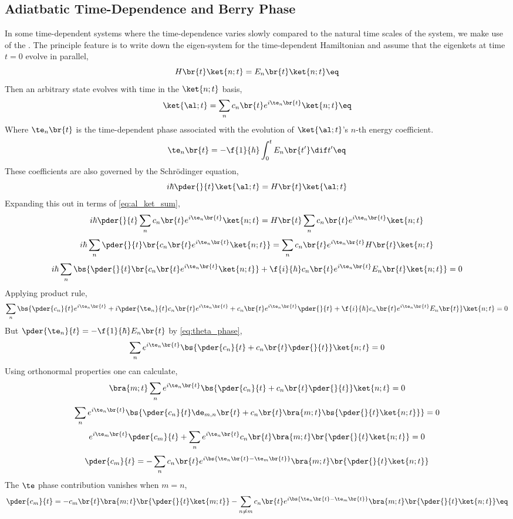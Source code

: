\documentclass{article}
\begin{document}
\subsection{Adiatbatic Time-Dependence and Berry Phase}
In some time-dependent systems where the time-dependence varies slowly compared to the natural time scales of the system, we make use of the . The principle feature is to write down the eigen-system for the time-dependent Hamiltonian and assume that the eigenkets at time $t = 0$ evolve in parallel,
\[ H\br{t} \ket {n ; t} = E_n\br{t} \ket{n ; t} \eq \label{eq:eigenket_energy}\]
Then an arbitrary state evolves with time in the $\ket{n;t}$ basis,
\[ \ket{\al ; t} = \sum_{n} c_n\br{t} e^{i \te_n\br{t}} \ket{n ; t} \eq \label{eq:al_ket_sum}\]
Where $\te_n\br{t}$ is the time-dependent phase associated with the evolution of $\ket{\al; t}$'s $n$-th energy coefficient.
\[ \te_n\br{t} = - \f{1}{\hbar} \int_{0}^{t} E_n\br{t'} \dif t' \eq \label{eq:theta_phase}\]
These coefficients are also governed by the Schrödinger equation,
\[ i \hbar \pder{}{t} \ket{\al; t} = H\br{t} \ket{\al; t} \]
Expanding this out in terms of \cref{eq:al_ket_sum},
\[ i \hbar \pder{}{t} \sum_{n} c_n\br{t} e^{i \te_n\br{t}} \ket{n ; t} = H\br{t} \sum_{n} c_n\br{t} e^{i \te_n\br{t}} \ket{n ; t} \]
\[ i \hbar \sum_{n}  \pder{}{t}\br{c_n\br{t} e^{i \te_n\br{t}} \ket{n ; t}} = \sum_{n} c_n\br{t} e^{i \te_n\br{t}} H\br{t} \ket{n ; t} \]
\[ i \hbar \sum_{n} \bs{\pder{}{t}\br{c_n\br{t} e^{i \te_n\br{t}} \ket{n ; t}} + \f{i}{\hbar} c_n\br{t} e^{i \te_n\br{t}} E_n\br{t} \ket{n ; t}} = 0 \]
Applying product rule,
\[ \sum_{n} \bs{\pder{c_n}{t} e^{i \te_n\br{t}}  + i \pder{\te_n}{t} c_n\br{t} e^{i \te_n\br{t}}  + c_n\br{t} e^{i \te_n\br{t}} \pder{}{t} + \f{i}{\hbar} c_n\br{t} e^{i \te_n\br{t}} E_n\br{t} }\ket{n;t} = 0 \]
But $\pder{\te_n}{t} = - \f{1}{\hbar} E_n\br{t}$ by \cref{eq:theta_phase},
\[ \sum_{n} e^{i \te_n\br{t}}\bs{\pder{c_n}{t} + c_n\br{t}  \pder{}{t}}\ket{n;t} = 0 \]
Using orthonormal properties one can calculate,
\[ \bra{m;t}\sum_{n} e^{i \te_n\br{t}}\bs{\pder{c_n}{t} + c_n\br{t}  \pder{}{t}}\ket{n;t} = 0 \]
\[ \sum_{n} e^{i \te_n\br{t}}\bs{\pder{c_n}{t}\de_{m,n}\br{t} + c_n\br{t}  \bra{m;t}\bs{\pder{}{t}\ket{n;t}}} = 0 \]
\[ e^{i \te_m\br{t}}\pder{c_m}{t} + \sum_{n} e^{i \te_n\br{t}}c_n\br{t}\bra{m;t}\br{\pder{}{t}\ket{n;t}} = 0 \]
\[ \pder{c_m}{t} = - \sum_{n} c_n\br{t}e^{i \bs{\te_n\br{t} - \te_m\br{t}}}\bra{m;t}\br{\pder{}{t}\ket{n;t}}\]
The $\te$ phase contribution vanishes when $m = n$,
\[ \pder{c_m}{t} = - c_m\br{t}\bra{m;t}\br{\pder{}{t}\ket{m;t}} - \sum_{n \neq m} c_n\br{t}e^{i \bs{\te_n\br{t} - \te_m\br{t}}}\bra{m;t}\br{\pder{}{t}\ket{n;t}} \eq \label{eq:dotcm_first}\]
\end{document}
